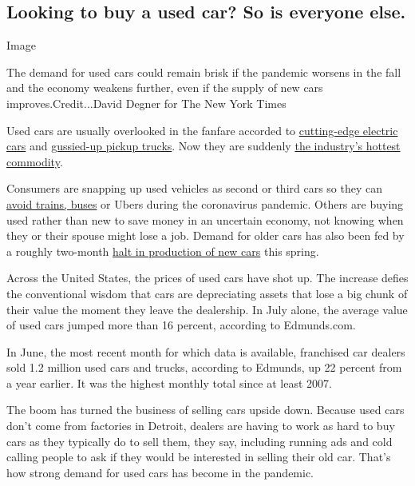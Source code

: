 \hypertarget{looking-to-buy-a-used-car-so-is-everyone-else}{%
\subsection{Looking to buy a used car? So is everyone
else.}\label{looking-to-buy-a-used-car-so-is-everyone-else}}

Image

The demand for used cars could remain brisk if the pandemic worsens in
the fall and the economy weakens further, even if the supply of new cars
improves.Credit...David Degner for The New York Times

Used cars are usually overlooked in the fanfare accorded to
\href{https://www.nytimes3xbfgragh.onion/2020/07/22/business/tesla-electric-car-audi-polestar.html}{cutting-edge
electric cars} and
\href{https://www.nytimes3xbfgragh.onion/2018/02/15/automobiles/wheels/luxury-trucks-suv.html}{gussied-up
pickup trucks}. Now they are suddenly
\href{https://www.nytimes3xbfgragh.onion/2020/09/07/business/used-cars-pandemic.html}{the
industry's hottest commodity}.

Consumers are snapping up used vehicles as second or third cars so they
can
\href{https://www.nytimes3xbfgragh.onion/2020/07/19/us/coronavirus-public-transit.html}{avoid
trains, buses} or Ubers during the coronavirus pandemic. Others are
buying used rather than new to save money in an uncertain economy, not
knowing when they or their spouse might lose a job. Demand for older
cars has also been fed by a roughly two-month
\href{https://www.nytimes3xbfgragh.onion/2020/03/18/business/economy/gm-ford-fiatchrysler-factories-virus.html}{halt
in production of new cars} this spring.

Across the United States, the prices of used cars have shot up. The
increase defies the conventional wisdom that cars are depreciating
assets that lose a big chunk of their value the moment they leave the
dealership. In July alone, the average value of used cars jumped more
than 16 percent, according to Edmunds.com.

In June, the most recent month for which data is available, franchised
car dealers sold 1.2 million used cars and trucks, according to Edmunds,
up 22 percent from a year earlier. It was the highest monthly total
since at least 2007.

The boom has turned the business of selling cars upside down. Because
used cars don't come from factories in Detroit, dealers are having to
work as hard to buy cars as they typically do to sell them, they say,
including running ads and cold calling people to ask if they would be
interested in selling their old car. That's how strong demand for used
cars has become in the pandemic.

